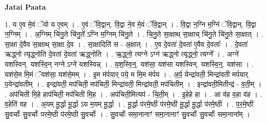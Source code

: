 \documentclass[17pt]{extarticle}
\begin{document}
\textbf{Jatai Paata} \newline

1. य ए॒व मे॒वं ॅयो य ए॒वम् । . ए॒वं ॅवि॒द्वान्. वि॒द्वा ने॒व मे॒वं ॅवि॒द्वान् । . वि॒द्वा न॒ग्नि म॒ग्निं ॅवि॒द्वान्. वि॒द्वा न॒ग्निम् । . अ॒ग्निम् चि॑नु॒ते चि॑नु॒ते᳚ ऽग्नि म॒ग्निम् चि॑नु॒ते । . चि॒नु॒ते सा॒क्षाथ् सा॒क्षाच् चि॑नु॒ते चि॑नु॒ते सा॒क्षात् । . सा॒क्षा दे॒वैव सा॒क्षाथ् सा॒क्षा दे॒व । . सा॒क्षादिति॑ स - अ॒क्षात् । . ए॒व दे॒वता॑ दे॒वता॑ ए॒वैव दे॒वताः᳚ । . दे॒वता॑ ऋद्ध्नो त्यृद्ध्नोति दे॒वता॑ दे॒वता॑ ऋद्ध्नोति । . ऋ॒द्ध्नो॒ त्यग्ने ऽग्न॑ ऋद्ध्नो त्यृद्ध्नो॒ त्यग्ने᳚ । . अग्ने॑ यशस्विन्. यशस्वि॒न् नग्ने ऽग्ने॑ यशस्विन्न् । . य॒श॒स्वि॒न्॒. यश॑सा॒ यश॑सा यशस्विन्. यशस्वि॒न्॒. यश॑सा । . यश॑से॒म मि॒मं ॅयश॑सा॒ यश॑से॒मम् । . इ॒म म॑र्पयार् पये॒ म मि॒म म॑र्पय । . अ॒र्प॒ येन्द्रा॑वती॒ मिन्द्रा॑वती मर्पयार् प॒येन्द्रा॑वतीम् । . इन्द्रा॑वती॒ मप॑चिती॒ मप॑चिती॒ मिन्द्रा॑वती॒ मिन्द्रा॑वती॒ मप॑चितीम् । . इन्द्रा॑वती॒मितीन्द्र॑ - व॒ती॒म् । . अप॑चिती मि॒हे हाप॑चिती॒ मप॑चिती मि॒ह । . अप॑चिती॒मित्यप॑ - चि॒ती॒म् । . इ॒हेहे हा । . आ व॑ह व॒हा व॑ह । . व॒हेति॑ वह । . अ॒यम् मू॒र्द्धा मू॒र्द्धा ऽय म॒यम् मू॒र्द्धा । . मू॒र्द्धा प॑रमे॒ष्ठी प॑रमे॒ष्ठी मू॒र्द्धा मू॒र्द्धा प॑रमे॒ष्ठी । . प॒र॒मे॒ष्ठी सु॒वर्चाः᳚ सु॒वर्चाः᳚ परमे॒ष्ठी प॑रमे॒ष्ठी सु॒वर्चाः᳚ । . सु॒वर्चाः᳚ समा॒नानाꣳ॑ समा॒नानाꣳ॑ सु॒वर्चाः᳚ सु॒वर्चाः᳚ समा॒नाना᳚म् । \newline
\end{document}
